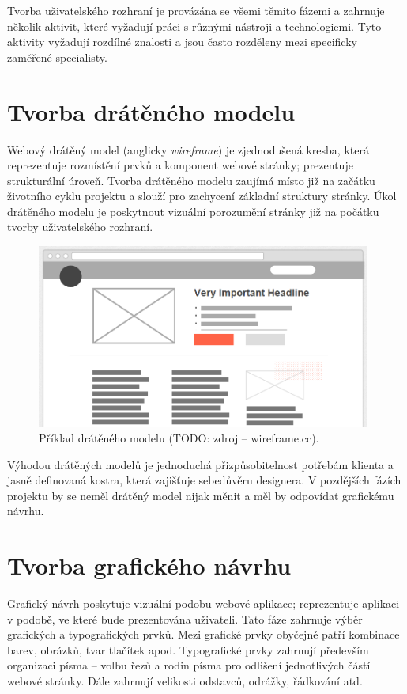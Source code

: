 Tvorba uživatelského rozhraní je provázána se všemi těmito fázemi a zahrnuje několik aktivit, které vyžadují práci s různými nástroji a technologiemi. Tyto aktivity vyžadují rozdílné znalosti a jsou často rozděleny mezi specificky zaměřené specialisty.

\section{Tvorba drátěného modelu}

Webový drátěný model (anglicky \textit{wireframe}) je zjednodušená kresba, která reprezentuje rozmístění prvků a komponent webové stránky; prezentuje strukturální úroveň. Tvorba drátěného modelu zaujímá místo již na začátku životního cyklu projektu a slouží pro zachycení základní struktury stránky. Úkol drátěného modelu je poskytnout vizuální porozumění stránky již na počátku tvorby uživatelského rozhraní.

\begin{figure}[htbp]
    \centering
    \includegraphics[width=11cm]{images/wireframe-example.png}
    \caption{Příklad drátěného modelu (TODO: zdroj -- wireframe.cc).}
\end{figure}

Výhodou drátěných modelů je jednoduchá přizpůsobitelnost potřebám klienta a jasně definovaná kostra, která zajišťuje sebedůvěru designera. V pozdějších fázích projektu by se neměl drátěný model nijak měnit a měl by odpovídat grafickému návrhu.

\section{Tvorba grafického návrhu}

Grafický návrh poskytuje vizuální podobu webové aplikace; reprezentuje aplikaci v podobě, ve které bude prezentována uživateli. Tato fáze zahrnuje výběr grafických a typografických prvků. Mezi grafické prvky obyčejně patří kombinace barev, obrázků, tvar tlačítek apod. Typografické prvky zahrnují především organizaci písma -- volbu řezů a rodin písma pro odlišení jednotlivých částí webové stránky. Dále zahrnují velikosti odstavců, odrážky, řádkování atd.

